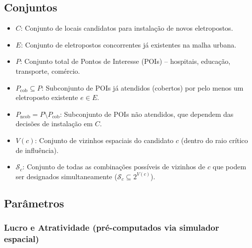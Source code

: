 \subsection{Conjuntos}

\begin{itemize}
    \item $C$: Conjunto de locais candidatos para instalação de novos eletropostos.
    \item $E$: Conjunto de eletropostos concorrentes já existentes na malha urbana.
    \item $P$: Conjunto total de Pontos de Interesse (POIs) -- hospitais, educação, transporte, comércio.
    \item $P_{\text{cob}} \subseteq P$: Subconjunto de POIs já atendidos (cobertos) por pelo menos um eletroposto existente $e \in E$.
    \item $P_{\text{ncob}} = P \setminus P_{\text{cob}}$: Subconjunto de POIs não atendidos, que dependem das decisões de instalação em $C$.
    \item $V(c)$: Conjunto de vizinhos espaciais do candidato $c$ (dentro do raio crítico de influência).
    \item $\mathcal{S}_c$: Conjunto de todas as combinações possíveis de vizinhos de $c$ que podem ser designados simultaneamente ($\mathcal{S}_c \subseteq 2^{V(c)}$).
\end{itemize}

\subsection{Parâmetros}

\subsubsection{Lucro e Atratividade (pré-computados via simulador espacial)}

